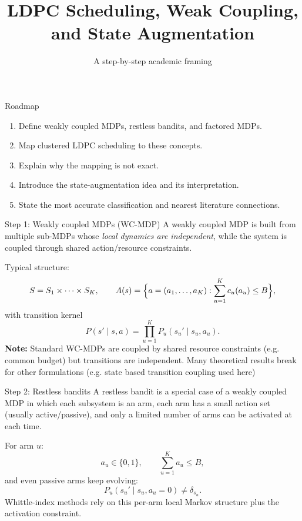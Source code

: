 \documentclass[aspectratio=169,professionalfonts]{beamer}
\title{LDPC Scheduling, Weak Coupling, and State Augmentation}
\subtitle{A step-by-step academic framing}
\author{}
\date{}
\begin{document}
\begin{frame}
  \titlepage
\end{frame}

\begin{frame}{Roadmap}
\begin{enumerate}
  \item Define weakly coupled MDPs, restless bandits, and factored MDPs.
  \item Map clustered LDPC scheduling to these concepts.
  \item Explain why the mapping is not exact.
  \item Introduce the state-augmentation idea and its interpretation.
  \item State the most accurate classification and nearest literature connections.
\end{enumerate}
\end{frame}

\begin{frame}{Step 1: Weakly coupled MDPs (WC-MDP)}
A weakly coupled MDP is built from multiple sub-MDPs whose \emph{local dynamics are independent}, while the system is coupled through shared action/resource constraints.

\vspace{0.4em}
Typical structure:
\[
S = S_1 \times \cdots \times S_K,
\qquad
A(s) = \Bigl\{a=(a_1,\dots,a_K): \sum_{u=1}^K c_u(a_u) \le B\Bigr\},
\]
with transition kernel
\[
P(s'\mid s,a)=\prod_{u=1}^K P_u(s_u'\mid s_u,a_u).
\]
\textbf{Note: }Standard WC-MDPs are coupled by shared resource constraints (e.g. common budget) but transitions are independent. Many theoretical results break for other formulations (e.g. state based transition coupling used here)
\end{frame}

\begin{frame}{Step 2: Restless bandits}
A restless bandit is a special case of a weakly coupled MDP in which each subsystem is an arm, each arm has a small action set (usually active/passive), and only a limited number of arms can be activated at each time.

\vspace{0.4em}
For arm $u$:
\[
a_u \in \{0,1\},
\qquad
\sum_{u=1}^K a_u \le B,
\]
and even passive arms keep evolving:
\[
P_u(s_u'\mid s_u,a_u=0) \neq \delta_{s_u}.
\]
Whittle-index methods rely on this per-arm local Markov structure plus the activation constraint.
\end{frame}
\end{document}
